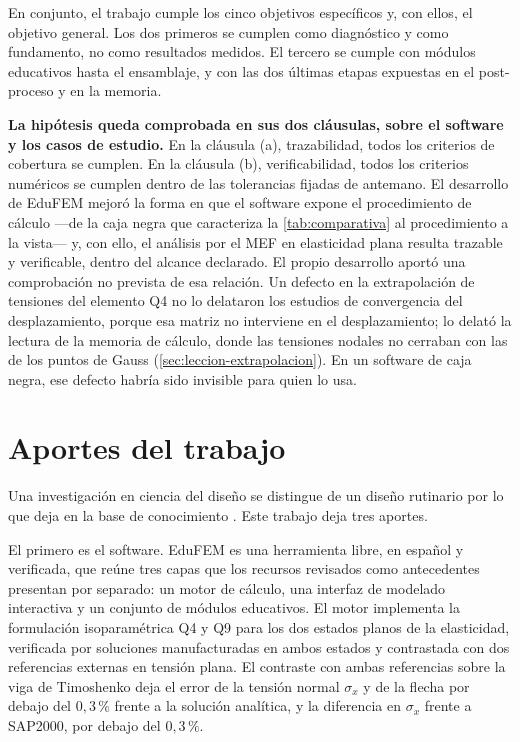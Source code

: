En conjunto, el trabajo cumple los cinco objetivos específicos y, con ellos, el objetivo general. Los dos primeros se cumplen como diagnóstico y como fundamento, no como resultados medidos. El tercero se cumple con módulos educativos hasta el ensamblaje, y con las dos últimas etapas expuestas en el post-proceso y en la memoria.

\textbf{La hipótesis queda comprobada en sus dos cláusulas, sobre el software y los casos de estudio.} En la cláusula (a), trazabilidad, todos los criterios de cobertura se cumplen. En la cláusula (b), verificabilidad, todos los criterios numéricos se cumplen dentro de las tolerancias fijadas de antemano. El desarrollo de EduFEM mejoró la forma en que el software expone el procedimiento de cálculo —de la caja negra que caracteriza la \autoref{tab:comparativa} al procedimiento a la vista— y, con ello, el análisis por el MEF en elasticidad plana resulta trazable y verificable, dentro del alcance declarado. El propio desarrollo aportó una comprobación no prevista de esa relación. Un defecto en la extrapolación de tensiones del elemento Q4 no lo delataron los estudios de convergencia del desplazamiento, porque esa matriz no interviene en el desplazamiento; lo delató la lectura de la memoria de cálculo, donde las tensiones nodales no cerraban con las de los puntos de Gauss (\autoref{sec:leccion-extrapolacion}). En un software de caja negra, ese defecto habría sido invisible para quien lo usa.

\section*{Aportes del trabajo}

Una investigación en ciencia del diseño se distingue de un diseño rutinario por lo que deja en la base de conocimiento \autocite[p.~81]{hevner2004design}. Este trabajo deja tres aportes.

El primero es el software. EduFEM es una herramienta libre, en español y verificada, que reúne tres capas que los recursos revisados como antecedentes presentan por separado: un motor de cálculo, una interfaz de modelado interactiva y un conjunto de módulos educativos. El motor implementa la formulación isoparamétrica Q4 y Q9 para los dos estados planos de la elasticidad, verificada por soluciones manufacturadas en ambos estados y contrastada con dos referencias externas en tensión plana. El contraste con ambas referencias sobre la viga de Timoshenko deja el error de la tensión normal $\sigma_x$ y de la flecha por debajo del $0{,}3\,\%$ frente a la solución analítica, y la diferencia en $\sigma_x$ frente a SAP2000, por debajo del $0{,}3\,\%$.

